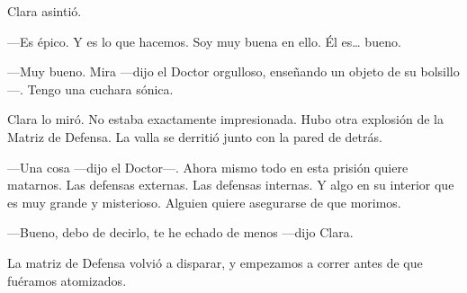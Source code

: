 Clara asintió.

---Es épico. Y es lo que hacemos. Soy muy buena en ello. Él es\ldots{}
bueno.

---Muy bueno. Mira ---dijo el Doctor orgulloso, enseñando un objeto de
su bolsillo---. Tengo una cuchara sónica.

Clara lo miró. No estaba exactamente impresionada. Hubo otra explosión
de la Matriz de Defensa. La valla se derritió junto con la pared de
detrás.

---Una cosa ---dijo el Doctor---. Ahora mismo todo en esta prisión
quiere matarnos. Las defensas externas. Las defensas internas. Y algo en
su interior que es muy grande y misterioso. Alguien quiere asegurarse de
que morimos.

---Bueno, debo de decirlo, te he echado de menos ---dijo Clara.

La matriz de Defensa volvió a disparar, y empezamos a correr antes de
que fuéramos atomizados.